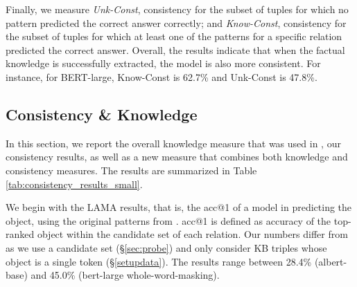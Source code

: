 Finally, we measure \emph{Unk-Const}, consistency  for the subset of tuples
for which no pattern predicted the correct answer correctly;
and \emph{Know-Const},
consistency for the subset of tuples for which
at least one of the patterns for a specific
relation predicted the correct answer.
Overall, the results indicate that when the factual knowledge is successfully extracted, the model is also more consistent.
For instance, for BERT-large, Know-Const  is 62.7\% and Unk-Const is 47.8\%. 


\subsection{Consistency \& Knowledge}
 In this section, we report
the overall knowledge measure that was used in \citet{lama},
our consistency results, as well as a new measure that
combines both knowledge and consistency measures.  The
results are summarized in Table
\ref{tab:consistency_results_small}.

We begin with the LAMA results, that is, the acc@1 of a
model in predicting the object, using the original patterns
from \citet{lama}. acc@1 is defined as accuracy of the
top-ranked object within the candidate set of each
relation. Our numbers differ from \citet{lama} as we use a
candidate set (\S\ref{sec:probe}) and only consider KB
triples whose object is a single token
(\S\ref{setupdata}). The results range between 28.4\%
(albert-base) and 45.0\% (bert-large whole-word-masking).


